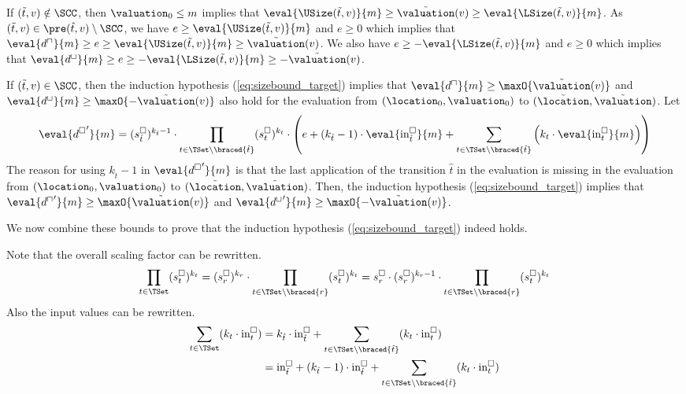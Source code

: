 If $(\tilde{t}, v) \notin \SCC$, then $\valuation_0 \leq m$ implies that $\eval{\USize(\tilde{t}, v)}{m} \geq \tilde{\valuation}(v) \geq \eval{\LSize(\tilde{t}, v)}{m}$.
As $(\tilde{t}, v) \in \pre(\hat{t}, v) \setminus \SCC$, we have $e \geq \eval{\USize(\tilde{t}, v)}{m}$ and $e \geq 0$ which implies that $\eval{d^\sqcap}{m} \geq e \geq \eval{\USize(\tilde{t}, v)}{m} \geq \tilde{\valuation}(v)$.
We also have $e \geq -\eval{\LSize(\tilde{t}, v)}{m}$ and $e \geq 0$ which implies that $\eval{d^\sqcup}{m} \geq e \geq -\eval{\LSize(\tilde{t}, v)}{m} \geq -\tilde{\valuation}(v)$.

If $(\tilde{t}, v) \in \SCC$, then the induction hypothesis (\ref{eq:sizebound_target}) implies that $\eval{d^\sqcap}{m} \geq \maxO{\tilde{\valuation}(v)}$ and $\eval{d^\sqcup}{m} \geq \maxO{-\tilde{\valuation}(v)}$ also hold for the evaluation from $(\location_0, \valuation_0)$ to $(\tilde{\location}, \tilde{\valuation})$.
Let
\begin{equation} \label{eq:induction_consequence}
  \eval{{d^\square}'}{m} = (s^\square_{\hat{t}})^{k_{\hat{t}} - 1} \cdot \prod_{t \in \TSet \setminus \braced{\hat{t}}} (s^\square_t)^{k_t} \cdot \left( e + \left( k_{\hat{t}} - 1 \right) \cdot \eval{\text{in}^\square_{\hat{t}}}{m} + \sum_{t \in \TSet \setminus \braced{\hat{t}}} \left( k_t \cdot \eval{\text{in}^\square_t}{m} \right) \right)
\end{equation}
The reason for using $k_{\hat{t}} - 1$ in $\eval{{d^\square}'}{m}$ is that the last application of the transition $\hat{t}$ in the evaluation is missing in the evaluation from $(\location_0, \valuation_0)$ to $(\tilde{\location}, \tilde{\valuation})$.
Then, the induction hypothesis (\ref{eq:sizebound_target}) implies that $\eval{{d^\sqcap}'}{m} \geq \maxO{\tilde{\valuation}(v)}$ and $\eval{{d^\sqcup}'}{m} \geq \maxO{-\tilde{\valuation}(v)}$.

We now combine these bounds to prove that the induction hypothesis (\ref{eq:sizebound_target}) indeed holds.

Note that the overall scaling factor can be rewritten.
\begin{equation} \label{eq:scaling_factor_reduction}
  \prod_{t \in \TSet} (s^\square_t)^{k_t} = (s^\square_r)^{k_r} \cdot \prod_{t \in \TSet \setminus \braced{r}} (s^\square_t)^{k_t} = s^\square_r \cdot (s^\square_r)^{k_r - 1} \cdot \prod_{t \in \TSet \setminus \braced{r}} (s^\square_t)^{k_t}
\end{equation}
Also the input values can be rewritten.
\begin{equation} \label{eq:input_reduction}
  \begin{split}
  \sum_{t \in \TSet} (k_t \cdot \text{in}^\square_t)
  & = k_{\hat{t}} \cdot \text{in}^\square_{\hat{t}} + \sum_{t \in \TSet \setminus \braced{\hat{t}}} (k_t \cdot \text{in}^\square_t) \\
  & = \text{in}^\square_{\hat{t}}
    + (k_{\hat{t}} - 1) \cdot \text{in}^\square_{\hat{t}}
    + \sum_{t \in \TSet \setminus \braced{\hat{t}}} (k_t \cdot \text{in}^\square_t)
  \end{split}
\end{equation}

